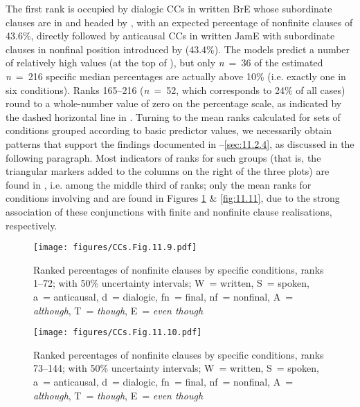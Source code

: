 The first rank is occupied by dialogic CCs in written BrE whose subordinate clauses are in  and headed by , with an expected percentage of nonfinite clauses of 43.6\%, directly followed by anticausal CCs in written JamE with subordinate clauses in nonfinal position introduced by  (43.4\%). The models predict a number of relatively high values (at the top of ), but only \textit{n}~=~36 of the estimated \textit{n}~=~216 specific median percentages are actually above 10\% (i.e. exactly one in six conditions). Ranks 165–216 (\textit{n}~=~52, which corresponds to 24\% of all cases) round to a whole-number value of zero on the percentage scale, as indicated by the dashed horizontal line in . Turning to the mean ranks calculated for sets of conditions grouped according to basic predictor values, we necessarily obtain patterns that support the findings documented in –\ref{sec:11.2.4}, as discussed in the following paragraph. Most indicators of ranks for such groups (that is, the triangular markers added to the columns on the right of the three plots) are found in , i.e. among the middle third of ranks; only the mean ranks for conditions involving  and  are found in Figures \ref{fig:11.9} \& \ref{fig:11.11}, due to the strong association of these conjunctions with finite and nonfinite clause realisations, respectively.

\begin{figure}
\texttt{[image: figures/CCs.Fig.11.9.pdf]}
\caption{\label{bkm:Ref75877136}\label{fig:11.9}Ranked percentages of nonfinite clauses by specific conditions, ranks 1–72; with 50\% uncertainty intervals; W~= written, S~= spoken, a~= anticausal, d~= dialogic, fn~= final, nf~= nonfinal, A~= \textit{although}, T~= \textit{though}, E~= \textit{even though}}
 \end{figure}

\begin{figure}
\texttt{[image: figures/CCs.Fig.11.10.pdf]}
\caption{\label{bkm:Ref75877141}\label{fig:11.10}Ranked percentages of nonfinite clauses by specific conditions, ranks 73–144; with 50\% uncertainty intervals; W~= written, S~= spoken, a~= anticausal, d~= dialogic, fn~= final, nf~= nonfinal, A~= \textit{although}, T~= \textit{though}, E~= \textit{even though}}
 \end{figure}

